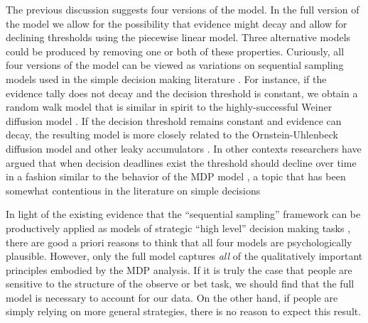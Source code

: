 \documentclass[authoryear]{elsarticle}
\begin{document}
The previous discussion suggests four versions of the model. In the full version of the model we allow for the possibility that evidence might decay and allow for declining thresholds using the piecewise linear model. Three alternative models could be produced by removing one or both of these properties. Curiously, all four versions of the model can be viewed as variations on sequential sampling models used in the simple decision making literature \citep{ratcliff_comparison_2004}. For instance, if the evidence tally does not decay and the decision threshold is constant, we obtain a random walk model that is similar in spirit to the highly-successful Weiner diffusion model \citep{ratcliff_theory_1978}. If the decision threshold remains constant and evidence can decay, the resulting model is more closely related to the Ornstein-Uhlenbeck diffusion model and other leaky accumulators \citep{smith_stochastic_2000,usher_time_2001}. In other contexts researchers have argued that when decision deadlines exist the  threshold should decline over time in a fashion similar to the behavior of the MDP model \citep{frazier_sequential_2007}, a topic that has been somewhat contentious in the literature on simple decisions \citep[see, e.g.,][]{shadlen_decision_2013,hawkins_revisiting_2015}

In light of the existing evidence that the ``sequential sampling'' framework can be productively applied as models of strategic ``high level'' decision making tasks \citep{lee_evidence_2004,lee_sequential_2003,lee_decision_2006,newell_right_2011,lee_modeling_2014}, there are good a priori reasons to think that all four models are psychologically plausible. However, only the full model captures {\it all} of the qualitatively important principles embodied by the MDP analysis. If it is truly the case that people are sensitive to the structure of the observe or bet task, we should find that the full model is necessary to account for our data. On the other hand, if people are simply relying on more general strategies, there is no reason to expect this result.
\end{document}
